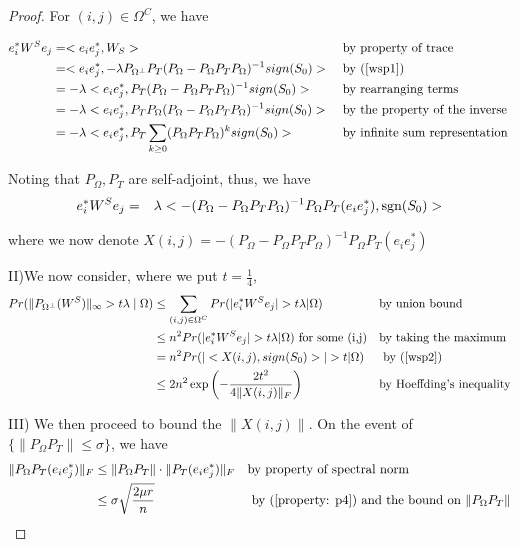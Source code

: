 \begin{proof}
For $(i,j)\in\Omega^{C}$, we have

\[
\begin{aligned}
e_{i}^{*}W^{S}e_{j} 
& = <e_{i}e_{j}^{*},W_{S}> 
&&\text{ by property of trace}\\
& = <e_{i}e_{j}^{*},-\lambda P_{\Omega^{\bot}}P_{T}(P_{\Omega}-P_{\Omega}P_{T}P_{\Omega})^{-1}sign(S_{0})> 
&&\text{ by (\ref{wsp1})}\\
& = -\lambda<e_{i}e_{j}^{*},P_{T}(P_{\Omega}-P_{\Omega}P_{T}P_{\Omega})^{-1}sign(S_{0})> 
&&\text{ by rearranging terms}\\
& = -\lambda<e_{i}e_{j}^{*},P_{T}P_{\Omega}(P_{\Omega}-P_{\Omega}P_{T}P_{\Omega})^{-1}sign(S_{0})> 
&&\text{ by the property of the inverse }\\
& = -\lambda<e_{i}e_{j}^{*},P_{T}\sum_{k\ge0}(P_{\Omega}P_{T}P_{\Omega})^{k}sign(S_{0})> 
&&\text{ by infinite sum representation}
\end{aligned}
\]

Noting that $P_{\Omega},P_{T}$ are self-adjoint, thus, we have
\begin{eqnarray}
e_{i}^{*}W^{S}e_{j} & = & \lambda<-(P_{\Omega}-P_{\Omega}P_{T}P_{\Omega})^{-1}P_{\Omega}P_{T}(e_{i}e_{j}^{*}), \text{sgn}(S_{0})>
\label{wsp2}
\end{eqnarray}


where we now denote $X(i,j)=-(P_{\Omega}-P_{\Omega}P_{T}P_{\Omega})^{-1}P_{\Omega}P_{T}(e_{i}e_{j}^{*})$

II)We now consider, where we put $t=\frac{1}{4}$,
\[
\begin{aligned}
Pr(\|P_{\Omega^{\bot}}(W^{S})\|_{\infty}>t\lambda\mid\Omega) 
& \le \sum_{(i,j)\in\Omega^{C}}Pr(|e_{i}^{*}W^{S}e_{j}|>t\lambda|\Omega) 
&&\text{by union bound}\\
& \le n^{2}Pr(|e_{i}^{*}W^{S}e_{j}|>t\lambda|\Omega)\text{ for some (i,j)} 
&&\text{by taking the maximum}\\
& = n^{2}Pr(|<X(i,j),sign(S_{0})>|>t|\Omega) 
&&\text{ by (\ref{wsp2})}\\
& \le 2n^{2}\exp \left( -\frac{2t^{2}}{4\|X(i,j)\|_{F}} \right)
&&\text{by Hoeffding's inequality}
\end{aligned}
\]

III) We then proceed to bound the $\|X(i,j)\|$. On the event of $\{\|P_{\Omega}P_{T}\|\le\sigma\}$,
we have
\[
\begin{aligned}
\|P_{\Omega}P_{T}(e_{i}e_{j}^{*})\|_{F} 
& \le \|P_{\Omega}P_{T}\|\cdot\|P_{T}(e_{i}e_{j}^{*})\|_{F} 
&&\text{by property of spectral norm}\\
& \le \sigma\sqrt{\frac{2\mu r}{n}} 
&&\text{ by (\ref{property: p4}) and the bound on } \|P_{\Omega}P_{T}\|
\end{aligned}
\]



\end{proof}
